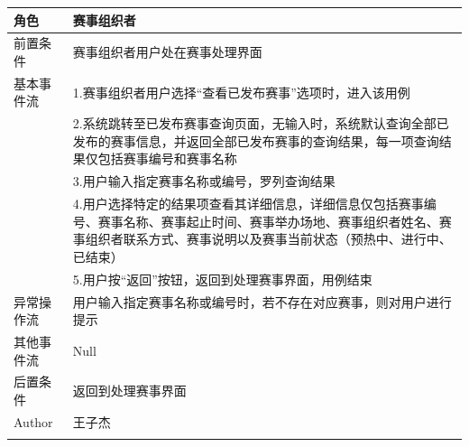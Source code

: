 \documentclass[a4paper,UTF8]{article}
\begin{document}
\begin{table}[H]
\begin{center}
\begin{tabular}{|p{}|p{}|}
			角色 & 赛事组织者\\
			\hline
			前置条件 & 赛事组织者用户处在赛事处理界面\\
			\hline
			基本事件流 & 1.赛事组织者用户选择“查看已发布赛事”选项时，进入该用例 \\& 2.系统跳转至已发布赛事查询页面，无输入时，系统默认查询全部已发布的赛事信息，并返回全部已发布赛事的查询结果，每一项查询结果仅包括赛事编号和赛事名称 \\& 3.用户输入指定赛事名称或编号，罗列查询结果 \\& 4.用户选择特定的结果项查看其详细信息，详细信息仅包括赛事编号、赛事名称、赛事起止时间、赛事举办场地、赛事组织者姓名、赛事组织者联系方式、赛事说明以及赛事当前状态（预热中、进行中、已结束）\\& 5.用户按“返回”按钮，返回到处理赛事界面，用例结束\\
			\hline
			异常操作流 & 用户输入指定赛事名称或编号时，若不存在对应赛事，则对用户进行提示 \\
			\hline
			其他事件流 & Null \\
			\hline
			后置条件 & 返回到处理赛事界面\\
			\hline
			Author & 王子杰 \\
			\noalign{\smallskip}
			\hline
			\noalign{\smallskip}
		\end{tabular}
	\end{center}
\end{table}
\end{document}
